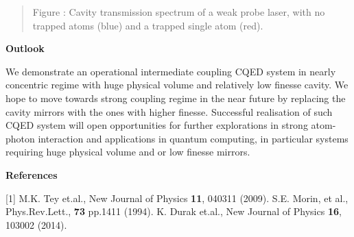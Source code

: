 \documentclass[portrait,a0,final]{a0poster} %
\makeatletter
\newenvironment{figurehere}
  {\def\@captype{figure}}
  {}
\newcommand{\figcaption}[1]{
  \vspace{0.5cm}
  \begin{center}
  \begin{quote}
    {\large {\sc Figure} \arabic{figure}: #1}
  \end{quote}
  \end{center}
  \stepcounter{figure}
}
\newenvironment{poster}{
  \begin{center}
  \begin{minipage}[c]{0.98\textwidth}
}{
  \end{minipage} 
  \end{center}
}
\makeatother
\begin{document}
\begin{poster}
\begin{multicols}{2}
\begin{figurehere}
    \figcaption{Cavity transmission spectrum of a weak probe laser, with no trapped atoms (blue) and a trapped single atom (red).}
\end{figurehere}


\begin{center}
  {\bf \Large \textsf {Outlook}}
\end{center}

We demonstrate an operational intermediate coupling CQED system in nearly concentric regime with huge physical volume and relatively low finesse cavity. We hope to move towards strong coupling regime in the near future by replacing the cavity mirrors with the ones with higher finesse. Successful realisation of such CQED system will open opportunities for further explorations in strong atom-photon interaction and applications in quantum computing, in particular systems requiring huge physical volume and or low finesse mirrors.

\begin{flushleft}
       \begin{center}{\bf \large \textsf {References}}\end{center}
       [1] M.K. Tey et.al., New Journal of Physics {\textbf{11}}, 040311 (2009).
	     \newline
       [2] S.E. Morin, et al., Phys.Rev.Lett., {\textbf {73}} pp.1411 (1994).
       \newline
	     [3] K. Durak et.al., New Journal of Physics {\textbf{16}}, 103002 (2014).

\end{flushleft}
    
\end{multicols}

\end{poster}
\end{document}
